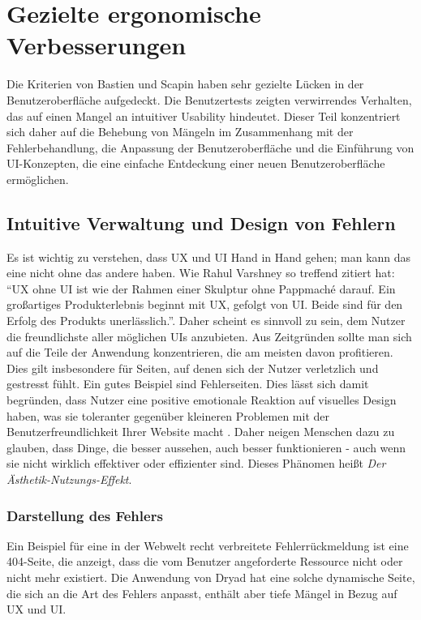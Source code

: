 \section{Gezielte ergonomische Verbesserungen} \label{sec:analyse-ergo}

Die Kriterien von Bastien und Scapin haben sehr gezielte Lücken in der Benutzeroberfläche aufgedeckt.
Die Benutzertests zeigten verwirrendes Verhalten, das auf einen Mangel an intuitiver Usability hindeutet.
Dieser Teil konzentriert sich daher auf die Behebung von Mängeln im Zusammenhang mit der Fehlerbehandlung, die Anpassung der Benutzeroberfläche und die Einführung von UI-Konzepten, die eine einfache Entdeckung einer neuen Benutzeroberfläche ermöglichen.

\subsection{Intuitive Verwaltung und Design von Fehlern}

Es ist wichtig zu verstehen, dass \ac{UX} und \ac{UI} Hand in Hand gehen; man kann das eine nicht ohne das andere haben.
Wie Rahul Varshney so treffend zitiert hat: ``UX ohne UI ist wie der Rahmen einer Skulptur ohne Pappmaché darauf. Ein großartiges Produkterlebnis beginnt mit UX, gefolgt von UI. Beide sind für den Erfolg des Produkts unerlässlich.''.
Daher scheint es sinnvoll zu sein, dem Nutzer die freundlichste aller möglichen UIs anzubieten.
Aus Zeitgründen sollte man sich auf die Teile der Anwendung konzentrieren, die am meisten davon profitieren.
Dies gilt insbesondere für Seiten, auf denen sich der Nutzer verletzlich und gestresst fühlt. Ein gutes Beispiel sind Fehlerseiten.
Dies lässt sich damit begründen, dass Nutzer eine positive emotionale Reaktion auf visuelles Design haben, was sie toleranter gegenüber kleineren Problemen mit der Benutzerfreundlichkeit Ihrer Website macht \cite{aestheticEffect}.
Daher neigen Menschen dazu zu glauben, dass Dinge, die besser aussehen, auch besser funktionieren - auch wenn sie nicht wirklich effektiver oder effizienter sind.
Dieses Phänomen heißt \textit{Der Ästhetik-Nutzungs-Effekt}.

\subsubsection{Darstellung des Fehlers}

Ein Beispiel für eine in der Webwelt recht verbreitete Fehlerrückmeldung ist eine 404-Seite, die anzeigt, dass die vom Benutzer angeforderte Ressource nicht oder nicht mehr existiert.
Die Anwendung von Dryad hat eine solche dynamische Seite, die sich an die Art des Fehlers anpasst, enthält aber tiefe Mängel in Bezug auf \ac{UX} und \ac{UI}.

